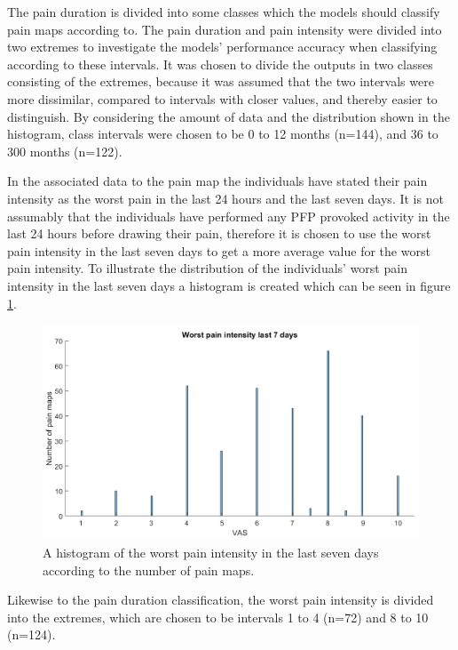 \noindent
The pain duration is divided into some classes which the models should classify pain maps according to. The pain duration and pain intensity were divided into two extremes to investigate the models' performance accuracy when classifying according to these intervals. It was chosen to divide the outputs in two classes consisting of the extremes, because it was assumed that the two intervals were more dissimilar, compared to intervals with closer values, and thereby easier to distinguish. 
By considering the amount of data and the distribution shown in the histogram, class intervals were chosen to be 0 to 12 months (n=144), and 36 to 300 months (n=122). \newline

\noindent
In the associated data to the pain map the individuals have stated their pain intensity as the worst pain in the last 24 hours and the last seven days.
It is not assumably that the individuals have performed any PFP provoked activity in the last 24 hours before drawing their pain, therefore it is chosen to use the worst pain intensity in the last seven days to get a more average value for the worst pain intensity.
To illustrate the distribution of the individuals’ worst pain intensity in the last seven days a histogram is created which can be seen in figure \ref{fig:histopain}.

\begin{figure} [H]
\centering
\includegraphics[width=1\textwidth]{figures/histrogramPain}
\caption{A histogram of the worst pain intensity in the last seven days according to the number of pain maps. }
\label{fig:histopain}
\end{figure}

\noindent
Likewise to the pain duration classification, the worst pain intensity is divided into the extremes, which are chosen to be intervals 1 to 4 (n=72) and 8 to 10 (n=124). 


